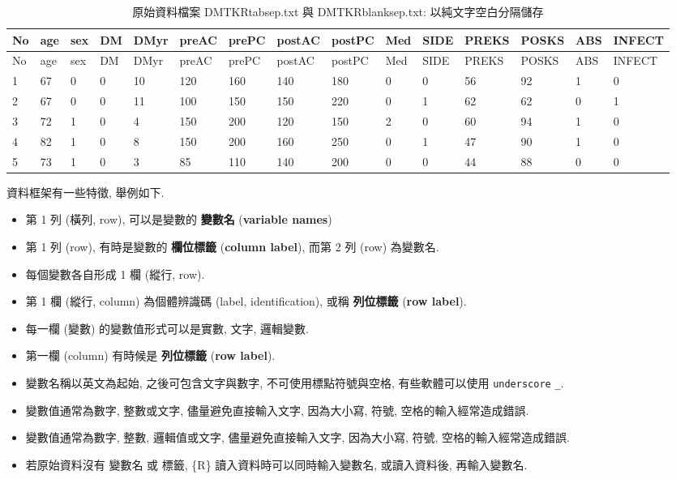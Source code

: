 \documentclass[
]{book}
\begin{document}
\begin{longtable}[]{@{}lllllllllllllll@{}}
\caption{原始資料檔案 DMTKRtabsep.txt 與 DMTKRblanksep.txt: 以純文字空白分隔儲存}\tabularnewline
\toprule
No & age & sex & DM & DMyr & preAC & prePC & postAC & postPC & Med & SIDE & PREKS & POSKS & ABS & INFECT\tabularnewline
\midrule
\endfirsthead
\toprule
No & age & sex & DM & DMyr & preAC & prePC & postAC & postPC & Med & SIDE & PREKS & POSKS & ABS & INFECT\tabularnewline
\midrule
\endhead
1 & 67 & 0 & 0 & 10 & 120 & 160 & 140 & 180 & 0 & 0 & 56 & 92 & 1 & 0\tabularnewline
2 & 67 & 0 & 0 & 11 & 100 & 150 & 150 & 220 & 0 & 1 & 62 & 62 & 0 & 1\tabularnewline
3 & 72 & 1 & 0 & 4 & 150 & 200 & 120 & 150 & 2 & 0 & 60 & 94 & 1 & 0\tabularnewline
4 & 82 & 1 & 0 & 8 & 150 & 200 & 160 & 250 & 0 & 1 & 47 & 90 & 1 & 0\tabularnewline
5 & 73 & 1 & 0 & 3 & 85 & 110 & 140 & 200 & 0 & 0 & 44 & 88 & 0 & 0\tabularnewline
\bottomrule
\end{longtable}

資料框架有一些特徵, 舉例如下.

\begin{itemize}
\item
  第 1 列 (橫列, row), 可以是變數的 \textbf{變數名} (\textbf{variable names})\\
\item
  第 1 列 (row), 有時是變數的 \textbf{欄位標籤} (\textbf{column label}),
  而第 2 列 (row) 為變數名.\\
\item
  每個變數各自形成 1 欄 (縱行, row).\\
\item
  第 1 欄 (縱行, column) 為個體辨識碼 (label, identification), 或稱 \textbf{列位標籤} (\textbf{row label}).\\
\item
  每一欄 (變數) 的變數值形式可以是實數, 文字, 邏輯變數.\\
\item
  第一欄 (column) 有時候是 \textbf{列位標籤} (\textbf{row label}).
\item
  變數名稱以英文為起始, 之後可包含文字與數字, 不可使用標點符號與空格,
  有些軟體可以使用 \texttt{underscore} \texttt{\_}.
\item
  變數值通常為數字,
  整數或文字,
  儘量避免直接輸入文字,
  因為大小寫, 符號, 空格的輸入經常造成錯誤.
\item
  變數值通常為數字,
  整數, 邏輯值或文字,
  儘量避免直接輸入文字,
  因為大小寫, 符號, 空格的輸入經常造成錯誤.
\item
  若原始資料沒有 變數名 或 標籤,
  \{R\} 讀入資料時可以同時輸入變數名,
  或讀入資料後, 再輸入變數名.
\end{itemize}
\end{document}
